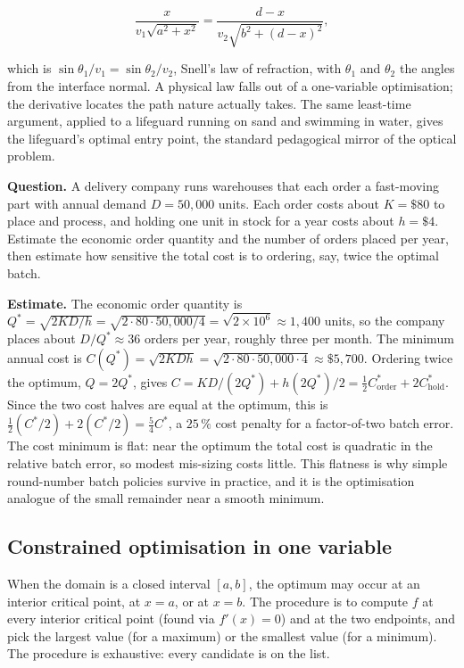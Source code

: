 \[
\frac{x}{v_{1}\sqrt{a^{2} + x^{2}}} = \frac{d - x}{v_{2}
\sqrt{b^{2} + (d - x)^{2}}},
\]

which is $\sin\theta_{1}/v_{1} = \sin\theta_{2}/v_{2}$, Snell's law
of refraction, with $\theta_{1}$ and $\theta_{2}$ the angles from
the interface normal. A physical law falls out of a one-variable
optimisation; the derivative locates the path nature actually
takes. The same least-time argument, applied to a lifeguard
running on sand and swimming in water, gives the lifeguard's
optimal entry point, the standard pedagogical mirror of the optical
problem.

\begin{estimation}
\textbf{Question.} A delivery company runs warehouses that each
order a fast-moving part with annual demand $D = 50{,}000$ units.
Each order costs about $K = \$80$ to place and process, and holding
one unit in stock for a year costs about $h = \$4$. Estimate the
economic order quantity and the number of orders placed per year,
then estimate how sensitive the total cost is to ordering, say,
twice the optimal batch.

\textbf{Estimate.} The economic order quantity is $Q^{*} =
\sqrt{2 K D / h} = \sqrt{2 \cdot 80 \cdot 50{,}000 / 4} =
\sqrt{2 \times 10^{6}} \approx 1{,}400$ units, so the company
places about $D/Q^{*} \approx 36$ orders per year, roughly three
per month. The minimum annual cost is $C(Q^{*}) = \sqrt{2 K D h} =
\sqrt{2 \cdot 80 \cdot 50{,}000 \cdot 4} \approx \$5{,}700$.
Ordering twice the optimum, $Q = 2 Q^{*}$, gives $C = K D /(2 Q^{*})
+ h (2 Q^{*})/2 = \tfrac{1}{2} C_{\text{order}}^{*} + 2
C_{\text{hold}}^{*}$. Since the two cost halves are equal at the
optimum, this is $\tfrac{1}{2}(C^{*}/2) + 2(C^{*}/2) = \tfrac{5}{4}
C^{*}$, a $25\,\%$ cost penalty for a factor-of-two batch error.
The cost minimum is flat: near the optimum the total cost is
quadratic in the relative batch error, so modest mis-sizing costs
little. This flatness is why simple round-number batch policies
survive in practice, and it is the optimisation analogue of the
small remainder near a smooth minimum.
\end{estimation}

\subsection{Constrained optimisation in one variable}

When the domain is a closed interval $[a, b]$, the optimum may
occur at an interior critical point, at $x = a$, or at $x = b$.
The procedure is to compute $f$ at every interior critical point
(found via $f'(x) = 0$) and at the two endpoints, and pick the
largest value (for a maximum) or the smallest value (for a
minimum). The procedure is exhaustive: every candidate is on the
list.

